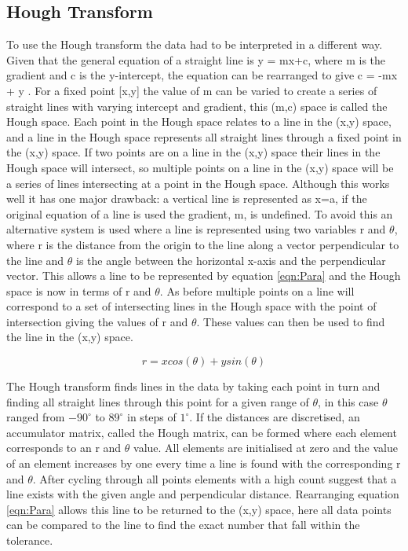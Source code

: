 \documentclass[a4paper]{article}
\begin{document}
\subsection{Hough Transform}
To use the Hough transform the data had to be interpreted in a different way. Given that the general equation of a straight line is y = mx+c, where m is the gradient and c is the y-intercept, the equation can be rearranged to give c = -mx + y \cite{Hough Transform 2}. For a fixed point [x,y]  the value of m can be varied to create a series of straight lines with varying intercept and gradient, this (m,c) space is called the Hough space. Each point in the Hough space relates to a line in the (x,y) space, and a line in the Hough space represents all straight lines through a fixed point in the (x,y) space. If two points are on a line in the (x,y) space their lines in the Hough space will intersect, so multiple points on a line in the (x,y) space will be a series of lines intersecting at a point in the Hough space. 
\newline\newline
Although this works well it has one major drawback: a vertical line is represented as x=a, if the original equation of a line is used the gradient, m, is undefined. To avoid this an alternative system is used where a line is represented using two variables r and $\theta$, where r is the distance from the origin to the line along a vector perpendicular to the line and $\theta$ is the angle between the horizontal x-axis and the perpendicular vector. This allows a line to be represented by equation \ref{eqn:Para} and the Hough space is now in terms of r and $\theta$. As before multiple points on a line will correspond to a set of intersecting lines in the Hough space with the point of intersection giving the values of r and $\theta$. These values can then be used to find the line in the (x,y) space.  

\begin{equation}
r = xcos(\theta) + ysin(\theta)
\label{eqn:Para}
\end{equation}

The Hough transform finds lines in the data by taking each point in turn and finding all straight lines through this point for a given range of $\theta$, in this case $\theta$ ranged from $-90^{\circ}$ to $89^{\circ}$ in steps of $1^{\circ}$. If the distances are discretised, an accumulator matrix, called the Hough matrix, can be formed where each element corresponds to an r and $\theta$ value. All elements are initialised at zero and the value of an element increases by one every time a line is found with the corresponding r and $\theta$. After cycling through all points elements with a high count suggest that a line exists with the given angle and perpendicular distance. Rearranging equation \ref{eqn:Para} allows this line to be returned to the (x,y) space, here all data points can be compared to the line to find the exact number that fall within the tolerance.   
\end{document}

